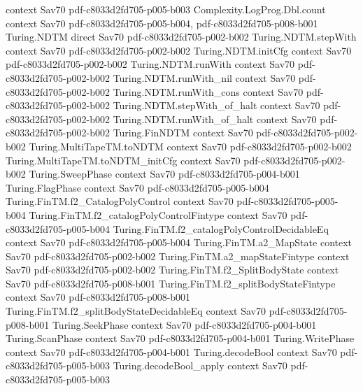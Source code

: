 \begin{theorem}
  {context}
  {Sav70}
  {pdf-c8033d2fd705-p005-b003}
\proofstep
  {Complexity.LogProg.Dbl.count}
  {context}
  {Sav70}
  {pdf-c8033d2fd705-p005-b004,
    pdf-c8033d2fd705-p008-b001}
\proofstep
  {Turing.NDTM}
  {direct}
  {Sav70}
  {pdf-c8033d2fd705-p002-b002}
\proofstep
  {Turing.NDTM.stepWith}
  {context}
  {Sav70}
  {pdf-c8033d2fd705-p002-b002}
\proofstep
  {Turing.NDTM.initCfg}
  {context}
  {Sav70}
  {pdf-c8033d2fd705-p002-b002}
\proofstep
  {Turing.NDTM.runWith}
  {context}
  {Sav70}
  {pdf-c8033d2fd705-p002-b002}
\proofstep
  {Turing.NDTM.runWith_nil}
  {context}
  {Sav70}
  {pdf-c8033d2fd705-p002-b002}
\proofstep
  {Turing.NDTM.runWith_cons}
  {context}
  {Sav70}
  {pdf-c8033d2fd705-p002-b002}
\proofstep
  {Turing.NDTM.stepWith_of_halt}
  {context}
  {Sav70}
  {pdf-c8033d2fd705-p002-b002}
\proofstep
  {Turing.NDTM.runWith_of_halt}
  {context}
  {Sav70}
  {pdf-c8033d2fd705-p002-b002}
\proofstep
  {Turing.FinNDTM}
  {context}
  {Sav70}
  {pdf-c8033d2fd705-p002-b002}
\proofstep
  {Turing.MultiTapeTM.toNDTM}
  {context}
  {Sav70}
  {pdf-c8033d2fd705-p002-b002}
\proofstep
  {Turing.MultiTapeTM.toNDTM_initCfg}
  {context}
  {Sav70}
  {pdf-c8033d2fd705-p002-b002}
\proofstep
  {Turing.SweepPhase}
  {context}
  {Sav70}
  {pdf-c8033d2fd705-p004-b001}
\proofstep
  {Turing.FlagPhase}
  {context}
  {Sav70}
  {pdf-c8033d2fd705-p005-b004}
\proofstep
  {Turing.FinTM.f2_CatalogPolyControl}
  {context}
  {Sav70}
  {pdf-c8033d2fd705-p005-b004}
\proofstep
  {Turing.FinTM.f2_catalogPolyControlFintype}
  {context}
  {Sav70}
  {pdf-c8033d2fd705-p005-b004}
\proofstep
  {Turing.FinTM.f2_catalogPolyControlDecidableEq}
  {context}
  {Sav70}
  {pdf-c8033d2fd705-p005-b004}
\proofstep
  {Turing.FinTM.a2_MapState}
  {context}
  {Sav70}
  {pdf-c8033d2fd705-p002-b002}
\proofstep
  {Turing.FinTM.a2_mapStateFintype}
  {context}
  {Sav70}
  {pdf-c8033d2fd705-p002-b002}
\proofstep
  {Turing.FinTM.f2_SplitBodyState}
  {context}
  {Sav70}
  {pdf-c8033d2fd705-p008-b001}
\proofstep
  {Turing.FinTM.f2_splitBodyStateFintype}
  {context}
  {Sav70}
  {pdf-c8033d2fd705-p008-b001}
\proofstep
  {Turing.FinTM.f2_splitBodyStateDecidableEq}
  {context}
  {Sav70}
  {pdf-c8033d2fd705-p008-b001}
\proofstep
  {Turing.SeekPhase}
  {context}
  {Sav70}
  {pdf-c8033d2fd705-p004-b001}
\proofstep
  {Turing.ScanPhase}
  {context}
  {Sav70}
  {pdf-c8033d2fd705-p004-b001}
\proofstep
  {Turing.WritePhase}
  {context}
  {Sav70}
  {pdf-c8033d2fd705-p004-b001}
\proofstep
  {Turing.decodeBool}
  {context}
  {Sav70}
  {pdf-c8033d2fd705-p005-b003}
\proofstep
  {Turing.decodeBool_apply}
  {context}
  {Sav70}
  {pdf-c8033d2fd705-p005-b003}

\end{theorem}
